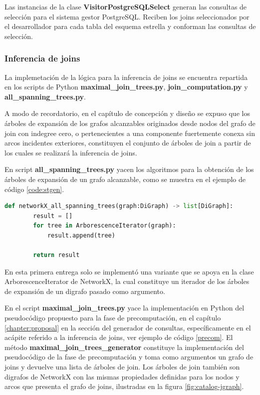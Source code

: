 Las instancias de la clase \textbf{VisitorPostgreSQLSelect} generan las consultas de selección para 
el sistema gestor PostgreSQL. Reciben los joins seleccionados por el desarrollador para cada tabla del esquema 
estrella y conforman las consultas de selección.

\subsubsection{Inferencia de joins}

La implemetaci\'on de la l\'ogica para la inferencia de joins se encuentra repartida 
en los scripts de Python \textbf{maximal\_join\_trees.py}, \textbf{join\_computation.py} y 
\textbf{all\_spanning\_trees.py}. 

A modo de recordatorio, en el cap\'itulo de concepción y diseño se expuso que los \'arboles de expansión 
de los grafos alcanzables originados desde nodos del grafo de join con indegree cero, o pertenecientes 
a una componente fuertemente conexa sin arcos incidentes exteriores, constituyen el conjunto de \'arboles 
de join a partir de los cuales se realizar\'a la inferencia de joins.

En script \textbf{all\_spanning\_trees.py} yacen los algoritmos para la obtención de los \'arboles de expansión 
de un grafo alcanzable, como se muestra en el ejemplo de c\'odigo \ref{code:stgen}.

\begin{lstlisting}[label={code:stgen}, caption={Algoritmo para la generación de \'arboles de expansión}, language={python}]
    def networkX_all_spanning_trees(graph:DiGraph) -> list[DiGraph]:
        result = []
        for tree in ArborescenceIterator(graph):
            result.append(tree)

        return result
\end{lstlisting}

En esta primera entrega solo se implement\'o una variante que se apoya en la 
clase ArborescenceIterator de NetworkX, la cual constituye un iterador de los \'arboles de expansión de un digrafo 
pasado como argumento.


En el script \textbf{maximal\_join\_trees.py} yace
la implementación en Python del pseudoc\'odigo propuesto para la fase de precomputaci\'on, en el 
capítulo \ref{chapter:proposal} en la sección del generador de consultas, específicamente en el ac\'apite referido 
a la inferencia de joins, ver ejemplo de c\'odigo \ref{precom}. El m\'etodo \textbf{maximal\_join\_trees\_generator} 
constituye la implementación del pseudoc\'odigo de la fase de precomputaci\'on y toma como argumentos 
un grafo de joins y devuelve una lista de \'arboles de join. Los \'arboles de join también son digrafos de 
NetworkX con las mismas propiedades definidas para los nodos y arcos que presenta el grafo de joins, 
ilustradas en la figura \ref{fig:catalog-jgraph}.

